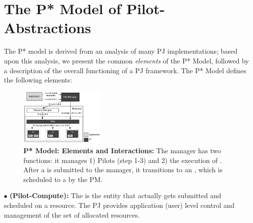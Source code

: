 \documentclass{sig-alternate}
\begin{document}
\section{The P* Model of Pilot-\\Abstractions}
\label{sec:pilot-model}

The P* model is derived from an analysis of many PJ implementations;
based upon this analysis, we present the common {\it elements} of the P*
Model, followed by a description of the overall functioning of a PJ framework. 
The P* Model defines the following elements:

\begin{figure}[t]
	\upp\upp
    \centering
    \includegraphics[width=0.37\textwidth]{figures/pstar_model_single.pdf}
    \caption{ \textbf{P* Model: Elements and
        Interactions:} The manager has two functions: it manages 1)
      Pilots (step 1-3) and 2) the execution of \cus. After a \cu is
      submitted to the manager, it transitions to an \su, which is
      scheduled to a \pilot by the PM.}
	\upp\upp
    \label{fig:figures_pstar}
\end{figure}





\noindent$\bullet$ \textbf{\pilot (Pilot-Compute):} The \pilot is the
  entity that actually gets submitted and scheduled on a resource.
  The PJ provides application (user)
  level control and management of the set of allocated resources.


\end{document}
